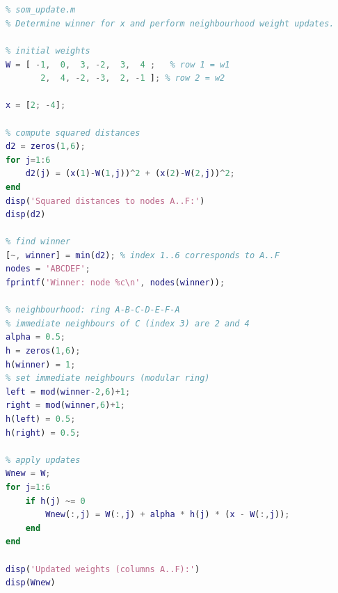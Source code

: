 \documentclass[11pt,a4paper]{article}
\begin{document}
\begin{lstlisting}[language=Matlab,caption={MATLAB script}]


% som_update.m
% Determine winner for x and perform neighbourhood weight updates.

% initial weights
W = [ -1,  0,  3, -2,  3,  4 ;   % row 1 = w1
       2,  4, -2, -3,  2, -1 ]; % row 2 = w2

x = [2; -4];

% compute squared distances
d2 = zeros(1,6);
for j=1:6
    d2(j) = (x(1)-W(1,j))^2 + (x(2)-W(2,j))^2;
end
disp('Squared distances to nodes A..F:')
disp(d2)

% find winner
[~, winner] = min(d2); % index 1..6 corresponds to A..F
nodes = 'ABCDEF';
fprintf('Winner: node %c\n', nodes(winner));

% neighbourhood: ring A-B-C-D-E-F-A
% immediate neighbours of C (index 3) are 2 and 4
alpha = 0.5;
h = zeros(1,6);
h(winner) = 1;
% set immediate neighbours (modular ring)
left = mod(winner-2,6)+1;
right = mod(winner,6)+1;
h(left) = 0.5;
h(right) = 0.5;

% apply updates
Wnew = W;
for j=1:6
    if h(j) ~= 0
        Wnew(:,j) = W(:,j) + alpha * h(j) * (x - W(:,j));
    end
end

disp('Updated weights (columns A..F):')
disp(Wnew)


\end{lstlisting}
\end{document}
